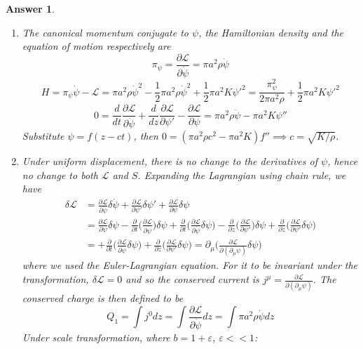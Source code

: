 \documentclass[a4paper]{article}
\newtheorem{ans}{Answer}[section]
\theoremstyle{new}
\begin{document}
\begin{ans}\leavevmode
\begin{enumerate}[label=(\alph*)]
\item The canonical momentum conjugate to $\psi$, the Hamiltonian density and the equation of motion respectively are
$$\pi_\psi=\frac{\partial\mathcal{L}}{\partial\dot{\psi}}=\pi a^2\rho\dot{\psi}$$
$$H=\pi_\psi\dot{\psi}-\mathcal{L}=\pi a^2\rho\dot{\psi}^2-\frac{1}{2}\pi a^2\rho\dot{\psi}^2+\frac{1}{2}\pi a^2K\psi'^2=\frac{\pi_\psi^2}{2\pi a^2\rho}+\frac{1}{2}\pi a^2K\psi'^2$$
$$0=\frac{d}{dt}\frac{\partial\mathcal{L}}{\partial\dot{\psi}}+\frac{d}{dz}\frac{\partial\mathcal{L}}{\partial\psi'}-\frac{\partial\mathcal{L}}{\partial\psi}=\pi a^2\rho\ddot{\psi}-\pi a^2K\psi''$$
Substitute $\psi=f(z-ct)$, then $0=(\pi a^2\rho c^2-\pi a^2K)f''\implies c=\sqrt{K/\rho}$.
\item Under uniform displacement, there is no change to the derivatives of $\psi$, hence no change to both $\mathcal{L}$ and $S$. Expanding the Lagrangian using chain rule, we have
\begin{align}
\delta\mathcal{L}&=\frac{\partial\mathcal{L}}{\partial\dot{\psi}}\delta\dot{\psi}+\frac{\partial\mathcal{L}}{\partial\psi'}\delta\psi'+\frac{\partial\mathcal{L}}{\partial\psi}\delta\psi\nonumber\\&=\frac{\partial\mathcal{L}}{\partial\psi}\delta\psi-\frac{\partial}{\partial t}\bigg(\frac{\partial\mathcal{L}}{\partial\dot{\psi}}\bigg)\delta\psi+\frac{\partial}{\partial t}\bigg(\frac{\partial\mathcal{L}}{\partial\dot{\psi}}\delta\psi\bigg)-\frac{\partial}{\partial z}\bigg(\frac{\partial\mathcal{L}}{\partial\psi'}\bigg)\delta\psi+\frac{\partial}{\partial z}\bigg(\frac{\partial\mathcal{L}}{\partial\psi'}\delta\psi\bigg)\nonumber\\&=+\frac{\partial}{\partial t}\bigg(\frac{\partial\mathcal{L}}{\partial\dot{\psi}}\delta\psi\bigg)+\frac{\partial}{\partial z}\bigg(\frac{\partial\mathcal{L}}{\partial\psi'}\delta\psi\bigg)=\partial_\mu\bigg(\frac{\partial\mathcal{L}}{\partial(\partial_\mu\psi)}\delta\psi\bigg)\nonumber
\end{align}
where we used the Euler-Lagrangian equation. For it to be invariant under the transformation, $\delta\mathcal{L}=0$ and so the conserved current is $j^\mu=\frac{\partial\mathcal{L}}{\partial(\partial_\mu\psi)}$. The conserved charge is then defined to be
$$Q_1=\int j^0dz=\int\frac{\partial\mathcal{L}}{\partial\dot{\psi}}dz=\int \pi a^2\rho\dot{\psi}dz$$
Under scale transformation, where $b=1+\varepsilon$, $\varepsilon<<1$:

\end{enumerate}
\end{ans}
\end{document}
